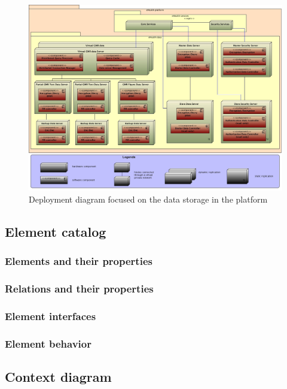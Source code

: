 \documentclass[a4paper,10pt]{article}
\begin{document}
\begin{figure}[!h]
  \includegraphics[width=\textwidth]{../images/deployment_data.jpg}
    \caption{Deployment diagram focused on the data storage in the platform}
\end{figure}

\subsection{Element catalog}

\subsubsection{Elements and their properties}

\subsubsection{Relations and their properties}

\subsubsection{Element interfaces}

\subsubsection{Element behavior}

\subsection{Context diagram}
\end{document}
